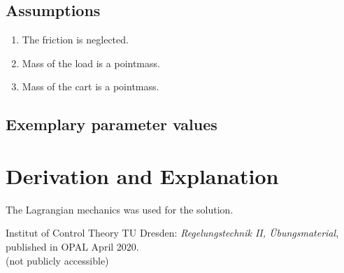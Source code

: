 \documentclass[10pt,a4paper]{article}
\begin{document}

	\subsection{Assumptions} %
		\begin{enumerate} %
			\item The friction is neglected.
			\item Mass of the load is a pointmass.
			\item Mass of the cart is a pointmass.
		\end{enumerate}


	\subsection{Exemplary parameter values}
	


	\section{Derivation and Explanation} %
	The Lagrangian mechanics was used for the solution.


	\begin{thebibliography}{10}
		Institut of Control Theory TU Dresden:
		\textit{Regelungstechnik II, Übungsmaterial}, published in OPAL April 2020.	\\
		(not publicly accessible)
	\end{thebibliography}
\end{document}
